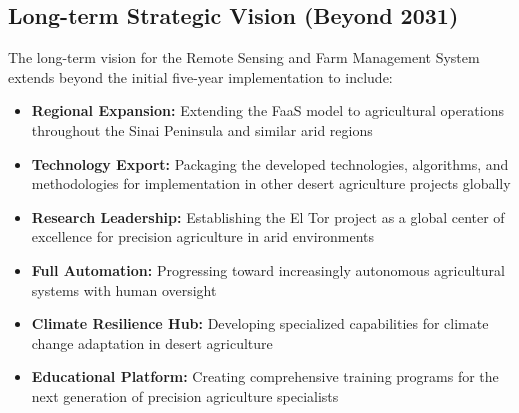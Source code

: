 \subsection{Long-term Strategic Vision (Beyond 2031)}

The long-term vision for the Remote Sensing and Farm Management System extends beyond the initial five-year implementation to include:

\begin{itemize}
    \item \textbf{Regional Expansion:} Extending the FaaS model to agricultural operations throughout the Sinai Peninsula and similar arid regions
    
    \item \textbf{Technology Export:} Packaging the developed technologies, algorithms, and methodologies for implementation in other desert agriculture projects globally
    
    \item \textbf{Research Leadership:} Establishing the El Tor project as a global center of excellence for precision agriculture in arid environments
    
    \item \textbf{Full Automation:} Progressing toward increasingly autonomous agricultural systems with human oversight
    
    \item \textbf{Climate Resilience Hub:} Developing specialized capabilities for climate change adaptation in desert agriculture
    
    \item \textbf{Educational Platform:} Creating comprehensive training programs for the next generation of precision agriculture specialists
\end{itemize} 
